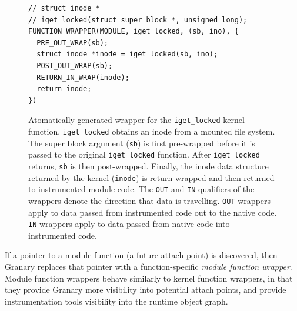 \documentclass[preprint]{sigplanconf}
\begin{document}
\begin{figure}[t]
\lstset{language=C, tabsize=2, stepnumber=1}
\begin{lstlisting}[basicstyle=\scriptsize\ttfamily]
// struct inode *
// iget_locked(struct super_block *, unsigned long);
FUNCTION_WRAPPER(MODULE, iget_locked, (sb, ino), {
  PRE_OUT_WRAP(sb);
  struct inode *inode = iget_locked(sb, ino);
  POST_OUT_WRAP(sb);
  RETURN_IN_WRAP(inode);
  return inode;
})
\end{lstlisting}
\caption{\label{fig:function_wrapper}Atomatically generated wrapper for the \texttt{iget\_locked} kernel function. \texttt{iget\_locked} obtains an inode from a mounted file system. The super block argument (\texttt{sb}) is first pre-wrapped before it is passed to the original \texttt{iget\_locked} function. After \texttt{iget\_locked} returns, \texttt{sb} is then post-wrapped. Finally, the inode data structure returned by the kernel (\texttt{inode}) is return-wrapped and then returned to instrumented module code. The \texttt{OUT} and \texttt{IN} qualifiers of the wrappers denote the direction that data is travelling. \texttt{OUT}-wrappers apply to data passed from instrumented code out to the native code. \texttt{IN}-wrappers apply to data passed from native code into instrumented code.}
\end{figure}



If a pointer to a module function (a future attach point) is discovered, then Granary replaces that pointer with a function-specific \emph{module function wrapper}. Module function wrappers behave similarly to kernel function wrappers, in that they provide Granary more visibility into potential attach points, and provide instrumentation tools visibility into the runtime object graph.





\end{document}
